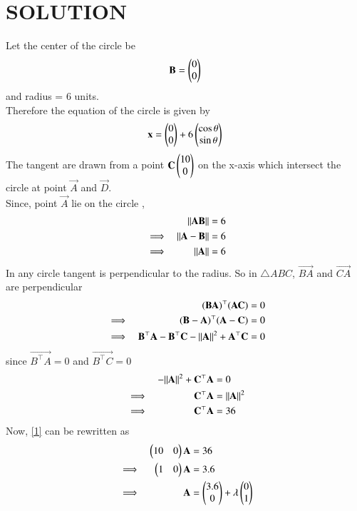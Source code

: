 \documentclass[journal,12pt,twocolumn]{IEEEtran}
\begin{document}
\section*{SOLUTION}
\begin{enumerate}
Let the center of the circle be 
\begin{align}
    \mathbf{B} = \begin{pmatrix}0 \\ 0\end{pmatrix}
\end{align}
and radius = 6 units.\\
Therefore the equation of the circle is given by
\begin{align}
    \mathbf{x} = \begin{pmatrix}0 \\ 0\end{pmatrix} + 6\begin{pmatrix}\cos \theta \\ \sin\theta\end{pmatrix}
\end{align}
The tangent are drawn from a point $\mathbf{C} \begin{pmatrix}10 \\ 0\end{pmatrix}$ on the x-axis which intersect the circle at point $\vec{A}$ and $\vec{D}$.\\
Since, point $\vec{A}$ lie on the circle ,
\begin{align}
    &&\lVert\mathbf{AB}\rVert =6\\
    &\implies& \lVert\mathbf{A-B}\rVert=6\\
    &\implies& \lVert\mathbf{A}\rVert=6
\end{align}
In any circle tangent is perpendicular to the radius.
So in $\triangle ABC$, $\vec{BA}$ and $\vec{CA}$ are perpendicular
\begin{align}
    &&\mathbf{(BA)}^\top \mathbf{(AC)} &= 0\\
    &\implies& \mathbf{(B-A)}^\top \mathbf{(A-C)} &= 0\\
    &\implies& \mathbf{B^\top A} - \mathbf{B^\top C} - \lVert\mathbf{A}\rVert^2 + \mathbf{A^\top C} &= 0
\end{align}
since $\vec{B^\top A}=0$ and $\vec{B^\top C}=0$
\begin{align}
    && - \lVert\mathbf{A}\rVert^2 + \mathbf{C^\top A} &= 0\\
    &\implies& \mathbf{C^\top A} &= \lVert\mathbf{A}\rVert^2\\
    &\implies& \mathbf{C^\top A} &= 36 \label{1}
\end{align}
Now, \eqref{1} can be rewritten as
\begin{align}
&&\myvec{10 & 0}\vec{A} &= 36\\
&\implies& \myvec{1 & 0}\vec{A} &= 3.6\\
&\implies& \vec{A} &= \myvec{3.6 \\ 0} + \lambda \myvec{0 \\ 1}\\

\end{align}
\end{enumerate}
\end{document}
